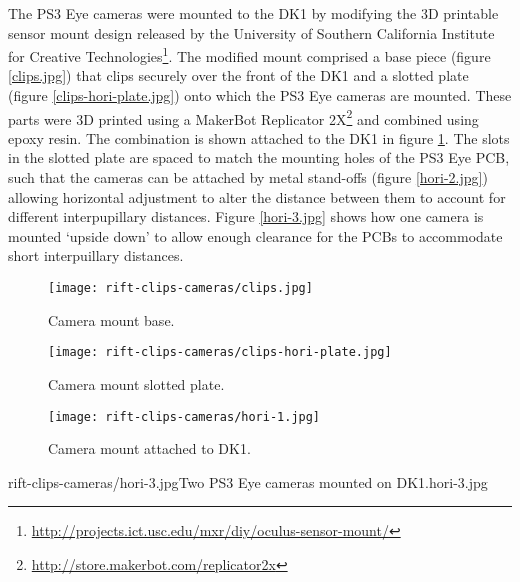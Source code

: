 The PS3 Eye cameras were mounted to the DK1 by modifying the 3D printable sensor mount design released by the University of Southern California Institute for Creative Technologies\footnote{\url{http://projects.ict.usc.edu/mxr/diy/oculus-sensor-mount/}}. The modified mount comprised a base piece (figure \ref{clips.jpg}) that clips securely over the front of the DK1 and a slotted plate (figure \ref{clips-hori-plate.jpg}) onto which the PS3 Eye cameras are mounted. These parts were 3D printed using a MakerBot Replicator 2X\footnote{\url{http://store.makerbot.com/replicator2x}} and combined using epoxy resin. The combination is shown attached to the DK1 in figure \ref{hori-1.jpg}. The slots in the slotted plate are spaced to match the mounting holes of the PS3 Eye PCB, such that the cameras can be attached by metal stand-offs (figure \ref{hori-2.jpg}) allowing horizontal adjustment to alter the distance between them to account for different interpupillary distances. Figure \ref{hori-3.jpg} shows how one camera is mounted `upside down' to allow enough clearance for the PCBs to accommodate short interpuillary distances.

\begin{figure}[h]
    \centering
    \begin{minipage}{.32\textwidth}
        \centering
        \texttt{[image: rift-clips-cameras/clips.jpg]}
        \caption{Camera mount base.}
        \label{clips.jpg}
    \end{minipage}%
    \hspace{.01\textwidth}
    \begin{minipage}{0.32\textwidth}
        \centering
        \texttt{[image: rift-clips-cameras/clips-hori-plate.jpg]}
        \caption{Camera mount slotted plate.}
        \label{clips-hori-plate.jpg}
    \end{minipage}%
    \hspace{.01\textwidth}
    \begin{minipage}{0.32\textwidth}
        \centering
        \texttt{[image: rift-clips-cameras/hori-1.jpg]}
        \caption{Camera mount attached to DK1.}
        \label{hori-1.jpg}
    \end{minipage}
\end{figure}

       {rift-clips-cameras/hori-3.jpg}{Two PS3 Eye cameras mounted on DK1.}{hori-3.jpg}


